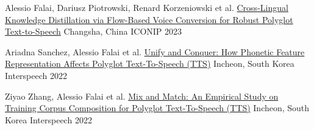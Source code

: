 
\begin{cvpubs}

  \cvpub
    {Alessio Falai, Dariusz Piotrowski, Renard Korzeniowski et al.}
    {\href{hhttps://link.springer.com/chapter/10.1007/978-981-99-8126-7_20}{Cross-Lingual Knowledge Distillation via Flow-Based Voice Conversion for Robust Polyglot Text-to-Speech}}
    {Changsha, China}
    {ICONIP 2023}

  \cvpub
    {Ariadna Sanchez, Alessio Falai et al.}
    {\href{https://www.isca-speech.org/archive/interspeech_2022/sanchez22_interspeech.html}{Unify and Conquer: How Phonetic Feature Representation Affects Polyglot Text-To-Speech (TTS)}}
    {Incheon, South Korea}
    {Interspeech 2022}

  \cvpub
    {Ziyao Zhang, Alessio Falai et al.}
    {\href{https://www.isca-speech.org/archive/interspeech_2022/zhang22c_interspeech.html}{Mix and Match: An Empirical Study on Training Corpus Composition for Polyglot Text-To-Speech (TTS)}}
    {Incheon, South Korea}
    {Interspeech 2022}

\end{cvpubs}
